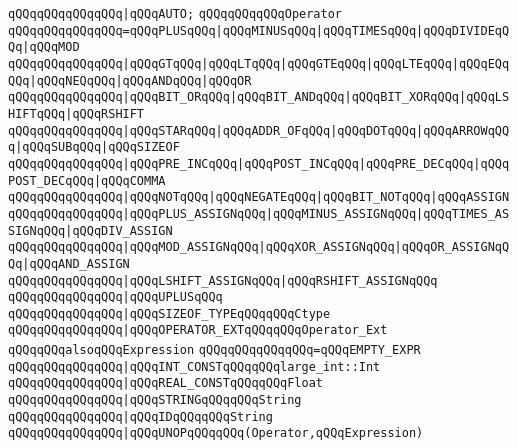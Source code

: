 \verb|qQQqqQQqqQQqqQQq|\verb#|qQQqAUTO;#\newline
\newline
\verb|qQQqqQQqqQQqOperator|\newline
\verb|qQQqqQQqqQQqqQQq=qQQqPLUSqQQq|\verb#|qQQqMINUSqQQq|qQQqTIMESqQQq|qQQqDIVIDEqQQq|qQQqMOD#\newline
\verb|qQQqqQQqqQQqqQQq|\verb#|qQQqGTqQQq|qQQqLTqQQq|qQQqGTEqQQq|qQQqLTEqQQq|qQQqEQqQQq|qQQqNEQqQQq|qQQqANDqQQq|qQQqOR#\newline
\verb|qQQqqQQqqQQqqQQq|\verb#|qQQqBIT_ORqQQq|qQQqBIT_ANDqQQq|qQQqBIT_XORqQQq|qQQqLSHIFTqQQq|qQQqRSHIFT#\newline
\verb|qQQqqQQqqQQqqQQq|\verb#|qQQqSTARqQQq|qQQqADDR_OFqQQq|qQQqDOTqQQq|qQQqARROWqQQq|qQQqSUBqQQq|qQQqSIZEOF#\newline
\verb|qQQqqQQqqQQqqQQq|\verb#|qQQqPRE_INCqQQq|qQQqPOST_INCqQQq|qQQqPRE_DECqQQq|qQQqPOST_DECqQQq|qQQqCOMMA#\newline
\verb|qQQqqQQqqQQqqQQq|\verb#|qQQqNOTqQQq|qQQqNEGATEqQQq|qQQqBIT_NOTqQQq|qQQqASSIGN#\newline
\verb|qQQqqQQqqQQqqQQq|\verb#|qQQqPLUS_ASSIGNqQQq|qQQqMINUS_ASSIGNqQQq|qQQqTIMES_ASSIGNqQQq|qQQqDIV_ASSIGN#\newline
\verb|qQQqqQQqqQQqqQQq|\verb#|qQQqMOD_ASSIGNqQQq|qQQqXOR_ASSIGNqQQq|qQQqOR_ASSIGNqQQq|qQQqAND_ASSIGN#\newline
\verb|qQQqqQQqqQQqqQQq|\verb#|qQQqLSHIFT_ASSIGNqQQq|qQQqRSHIFT_ASSIGNqQQq#\newline
\verb|qQQqqQQqqQQqqQQq|\verb#|qQQqUPLUSqQQq#\newline
\verb|qQQqqQQqqQQqqQQq|\verb#|qQQqSIZEOF_TYPEqQQqqQQqCtype#\newline
\verb|qQQqqQQqqQQqqQQq|\verb#|qQQqOPERATOR_EXTqQQqqQQqOperator_Ext#\newline
\newline
\verb|qQQqqQQqalsoqQQqExpression|\newline
\verb|qQQqqQQqqQQqqQQq=qQQqEMPTY_EXPR|\newline
\verb|qQQqqQQqqQQqqQQq|\verb#|qQQqINT_CONSTqQQqqQQqlarge_int::Int#\newline
\verb|qQQqqQQqqQQqqQQq|\verb#|qQQqREAL_CONSTqQQqqQQqFloat#\newline
\verb|qQQqqQQqqQQqqQQq|\verb#|qQQqSTRINGqQQqqQQqString#\newline
\verb|qQQqqQQqqQQqqQQq|\verb#|qQQqIDqQQqqQQqString#\newline
\verb|qQQqqQQqqQQqqQQq|\verb#|qQQqUNOPqQQqqQQq(Operator,qQQqExpression)#\newline
